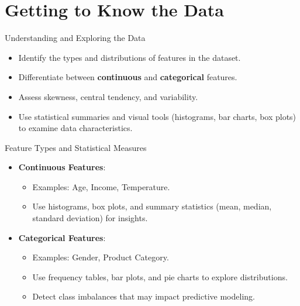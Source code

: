 \documentclass[aspectratio=169,xcolor=dvipsnames]{beamer}
\begin{document}
\section{Getting to Know the Data}
\begin{frame}{Understanding and Exploring the Data}
\begin{itemize}
    \setlength\itemsep{0.5cm}
    \item Identify the types and distributions of features in the dataset.
    \item Differentiate between \textbf{continuous} and \textbf{categorical} features.
    \item Assess skewness, central tendency, and variability.
    \item Use statistical summaries and visual tools (histograms, bar charts, box plots) to examine data characteristics.
\end{itemize}
\end{frame}

\begin{frame}{Feature Types and Statistical Measures}
\begin{itemize}
    \setlength\itemsep{0.5cm}
    \item \textbf{Continuous Features}:
    \begin{itemize}
        \item Examples: Age, Income, Temperature.
        \item Use histograms, box plots, and summary statistics (mean, median, standard deviation) for insights.
    \end{itemize}
    \item \textbf{Categorical Features}:
    \begin{itemize}
        \item Examples: Gender, Product Category.
        \item Use frequency tables, bar plots, and pie charts to explore distributions.
        \item Detect class imbalances that may impact predictive modeling.
    \end{itemize}
\end{itemize}
\end{frame}
\end{document}
